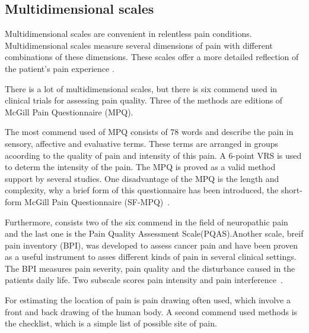\subsection{Multidimensional scales}
Multidimensional scales are convenient in relentless pain conditions. Multidimensional scales measure several dimensions of pain with different combinations of these dimensions. These scales offer a more detailed reflection of the patient's pain experience \cite{Briggs2010}.

There is a lot of multidimensional scales, but there is six commend used in clinical trials for assessing pain quality. Three of the methods are editions of McGill Pain Questionnaire (MPQ).

The most commend used of MPQ consists of 78 words and describe the pain in sensory, affective and evaluative terms. These terms are arranged in groups acoording to the quality of pain and intensity of this pain. A 6-point VRS is used to determ the intensity of the pain. The MPQ is proved as a valid method support by several studies. One disadvantage of the MPQ is the length and complexity, why a brief form of this questionnaire has been introduced, the short-form McGill Pain Questionnaire (SF-MPQ)~\cite{Katz2001}. 

Furthermore, consists two of the six commend in the field of neuropathic pain and the last one is the Pain Quality Assessment Scale(PQAS).Another scale, breif pain inventory (BPI), was developed to assess cancer pain and have been proven as a useful instrument to asses different kinds of pain in several clinical settings. The BPI measures pain severity, pain quality and the disturbance caused in the patients daily life. Two subscale scores pain intensity and pain interference~\cite{Katz2001}.  

For estimating the location of pain is pain drawing often used, which involve a front and back drawing of the human body. A second commend used methods is the checklist, which is a simple list of possible site of pain.~\cite{Jensen2001} 



